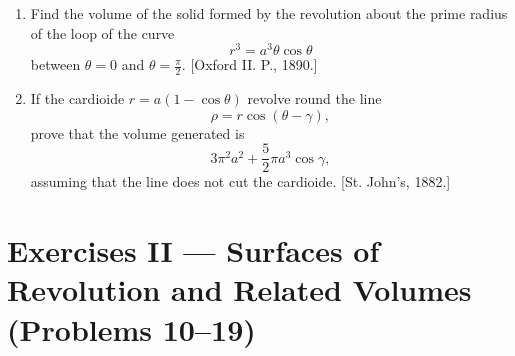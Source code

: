 \documentclass[11pt, a4paper]{article}
\newcommand{\source}[1]{\hfill\textnormal{[#1]}}
\begin{document}
\begin{enumerate}[leftmargin=2em]
\item Find the volume of the solid formed by the revolution about the prime radius of the loop of the curve
\[
r^3=a^3\theta\cos\theta
\]
between $\theta=0$ and $\theta=\frac{\pi}{2}$.
\source{Oxford II. P., 1890.}

\item If the cardioide $r=a(1-\cos\theta)$ revolve round the line
\[
\rho=r\cos(\theta-\gamma),
\]
prove that the volume generated is
\[
3\pi^2a^2+\frac{5}{2}\pi a^3\cos\gamma,
\]
assuming that the line does not cut the cardioide.
\source{St. John's, 1882.}

\end{enumerate}

\section*{Exercises II --- Surfaces of Revolution and Related Volumes (Problems 10--19)}
\end{document}
